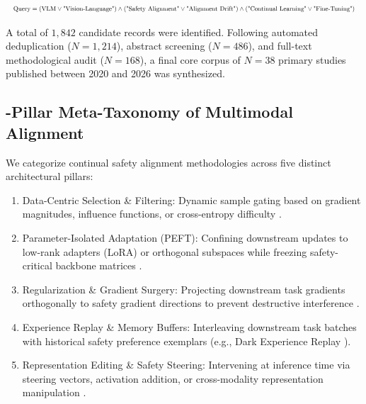 \documentclass[10pt,journal,compsoc,twocolumn]{IEEEtran}
\begin{document}
\begin{equation}
\resizebox{\columnwidth}{!}{$\displaystyle
\begin{aligned}
\text{Query} = (\text{VLM} \lor \text{"Vision-Language"}) \land (\text{"Safety Alignment"} \lor \text{"Alignment Drift"}) \land (\text{"Continual Learning"} \lor \text{"Fine-Tuning"})
\end{aligned}
$}
\end{equation}





















A total of $1,842$ candidate records were identified. Following automated deduplication ($N = 1,214$), abstract screening ($N = 486$), and full-text methodological audit ($N = 168$), a final core corpus of $N = 38$ primary studies published between 2020 and 2026 was synthesized.


\subsection{-Pillar Meta-Taxonomy of Multimodal Alignment}

We categorize continual safety alignment methodologies across five distinct architectural pillars:
\begin{enumerate}
  \item Data-Centric Selection \& Filtering: Dynamic sample gating based on gradient magnitudes, influence functions, or cross-entropy difficulty \cite{arxiv_2604_17215}.
  \item Parameter-Isolated Adaptation (PEFT): Confining downstream updates to low-rank adapters (LoRA) or orthogonal subspaces while freezing safety-critical backbone matrices \cite{arxiv_2308_12898}.
  \item Regularization \& Gradient Surgery: Projecting downstream task gradients orthogonally to safety gradient directions to prevent destructive interference \cite{arxiv_2404_01131}.
  \item Experience Replay \& Memory Buffers: Interleaving downstream task batches with historical safety preference exemplars (e.g., Dark Experience Replay \cite{arxiv_2406_04028}).
  \item Representation Editing \& Safety Steering: Intervening at inference time via steering vectors, activation addition, or cross-modality representation manipulation \cite{arxiv_2501_02497}.
\end{enumerate}
\end{document}
